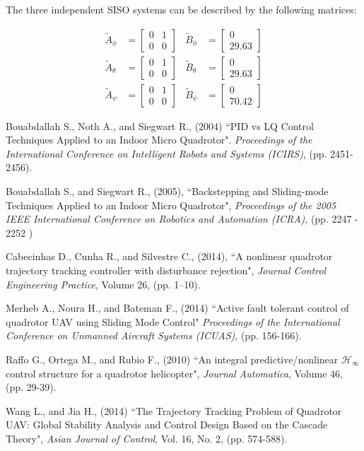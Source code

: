 \documentclass[12pt]{article}
\begin{document}
The three independent SISO systems can be described by the following matrices:

\begin{align*}
  \tilde{A}_\phi &= \begin{bmatrix} 0 & 1 \\ 0 & 0 \end{bmatrix} & \tilde{B}_\phi &= \begin{bmatrix} 0 \\ 29.63 \end{bmatrix} \\
  \tilde{A}_\theta &= \begin{bmatrix} 0 & 1 \\ 0 & 0 \end{bmatrix} & \tilde{B}_\theta &= \begin{bmatrix} 0 \\ 29.63 \end{bmatrix} \\
  \tilde{A}_\psi &= \begin{bmatrix} 0 & 1 \\ 0 & 0 \end{bmatrix} & \tilde{B}_\psi &= \begin{bmatrix} 0 \\ 70.42 \end{bmatrix}
\end{align*}
 
\begin{thebibliography}{100} %
 Bouabdallah S., Noth A., and Siegwart R., (2004) 
``PID vs LQ Control Techniques Applied to an Indoor Micro Quadrotor". 
\emph{Proceedings of the International Conference on Intelligent Robots and Systems (ICIRS)}, 
(pp. 2451-2456).

 Bouabdallah S., and Siegwart R., (2005),
``Backstepping and Sliding-mode Techniques Applied to an Indoor Micro Quadrotor",
\emph{Proceedings of the 2005 IEEE International Conference on Robotics and Automation (ICRA)}, 
(pp. 2247 - 2252 )

 Cabecinhas D., Cunha R., and Silvestre C., (2014),
``A nonlinear quadrotor trajectory tracking controller with disturbance rejection",
\emph{Journal Control Engineering Practice}, Volume 26, (pp. 1–10).

 Merheb A., Noura H., and Bateman F., (2014)
``Active fault tolerant control of quadrotor UAV using Sliding Mode Control"
\emph{Proceedings of the International Conference on Unmanned Aircraft Systems (ICUAS)}, 
(pp. 156-166).

 Raffo G., Ortega M., and Rubio F., (2010)
``An integral predictive/nonlinear $\mathcal{H} _\infty$ control structure for a quadrotor helicopter",
\emph{Journal Automatica}, Volume 46, (pp. 29-39).

 Wang L., and Jia H., (2014) 
``The Trajectory Tracking Problem of Quadrotor UAV: Global Stability Analysis and Control Design Based on the Cascade Theory",
\emph{Asian Journal of Control}, Vol. 16, No. 2, (pp. 574-588).
\end{thebibliography}
\end{document}
